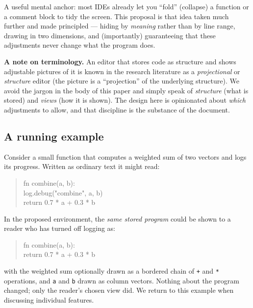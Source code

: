 \documentclass[11pt]{article}
\begin{document}
A useful mental anchor: most IDEs already let you ``fold'' (collapse) a function or a comment block to tidy the screen. This proposal is that idea taken much further and made principled --- hiding by \emph{meaning} rather than by line range, drawing in two dimensions, and (importantly) guaranteeing that these adjustments never change what the program does.

\begin{defbox}
\textbf{A note on terminology.} An editor that stores code as structure and shows adjustable pictures of it is known in the research literature as a \emph{projectional} or \emph{structure} editor (the picture is a ``projection'' of the underlying structure). We avoid the jargon in the body of this paper and simply speak of \emph{structure} (what is stored) and \emph{views} (how it is shown). The design here is opinionated about \emph{which} adjustments to allow, and that discipline is the substance of the document.
\end{defbox}

\subsection{A running example}
Consider a small function that computes a weighted sum of two vectors and logs its progress. Written as ordinary text it might read:

\begin{quote}\ttfamily
fn combine(a, b):\\
\hspace*{1.5em}log.debug("combine", a, b)\\
\hspace*{1.5em}return 0.7 * a + 0.3 * b
\end{quote}

\noindent In the proposed environment, the \emph{same stored program} could be shown to a reader who has turned off logging as:

\begin{quote}\ttfamily
fn combine(a, b):\\
\hspace*{1.5em}return 0.7 * a + 0.3 * b
\end{quote}

\noindent with the weighted sum optionally drawn as a bordered chain of \texttt{+} and \texttt{*} operations, and \texttt{a} and \texttt{b} drawn as column vectors. Nothing about the program changed; only the reader's chosen view did. We return to this example when discussing individual features.
\end{document}
